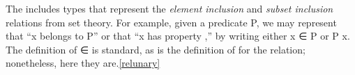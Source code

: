 




The \ualib includes types that represent the \emph{element inclusion} and \emph{subset inclusion} relations from set theory. For example, given a predicate \af P, we may represent that  ``\ab x belongs to \af P'' or that ``\ab x has property ,'' by writing either \ab x \af ∈ \af P or \af P \ab x.  The definition of \af ∈ is standard, as is the definition of  for the  relation; nonetheless, here they are.\cref{relunary}
\ccpad
\begin{code}%
\>[0]\AgdaSpace{}%
\AgdaSymbol{:}\AgdaSpace{}%
\AgdaSpace{}%
\AgdaSpace{}%
\AgdaSpace{}%
\AgdaSpace{}%
\AgdaSpace{}%
\AgdaSpace{}%
\AgdaSpace{}%
\<%
\\
\>[0]\AgdaSpace{}%
\AgdaSpace{}%
\AgdaSpace{}%
\AgdaSymbol{=}\AgdaSpace{}%
\AgdaSpace{}%
\<%
\end{code}
\scpad
